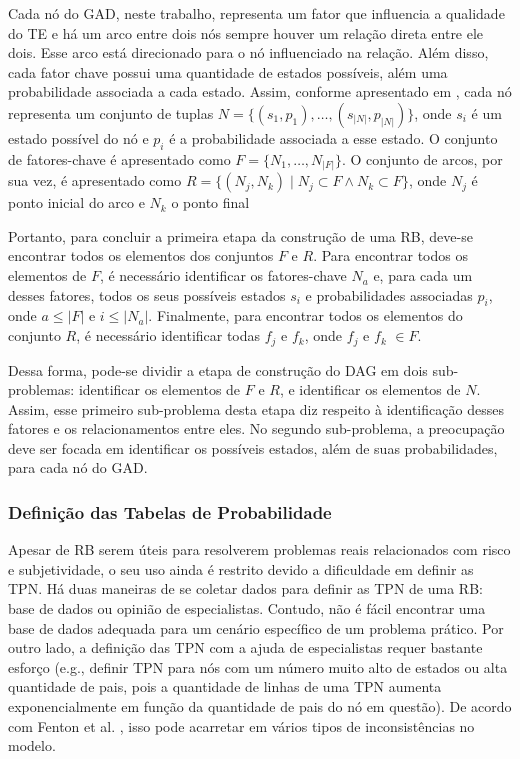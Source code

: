 Cada nó do GAD, neste trabalho, representa um fator que influencia a qualidade do TE e há um arco entre dois nós sempre houver um relação direta entre ele dois. Esse arco está direcionado para o nó influenciado na relação. Além disso, cada fator chave possui uma quantidade de estados possíveis, além uma probabilidade associada a cada estado. Assim, conforme apresentado em \cite{perkusich2013}, cada nó representa um conjunto de tuplas $N = \{(s_{1},p_{1}), \ldots, (s_{\left|{N}\right|},p_{\left|{N}\right|})\}$, onde $s_{i}$ é um estado possível do nó e $p_{i}$ é a probabilidade associada a esse estado. O conjunto de fatores-chave é apresentado como $F = \{N_{1}, \ldots, N_{\left|{F}\right|}\}$. O conjunto de arcos, por sua vez, é apresentado como $R = \{(N_{j},N_{k}) \mid N_{j} \subset F \wedge N_{k} \subset F\}$, onde $N_{j}$ é ponto inicial do arco e $N_{k}$ o ponto final

Portanto, para concluir a primeira etapa da construção de uma RB, deve-se encontrar todos os elementos dos conjuntos $F$ e $R$. Para encontrar todos os elementos de $F$, é necessário identificar os fatores-chave $N_{a}$ e, para cada um desses fatores, todos os seus possíveis estados $s_{i}$ e probabilidades associadas $p_{i}$, onde $a \le \left|{F}\right|$ e $i \le \left|{N_{a}}\right|$. Finalmente, para encontrar todos os elementos do conjunto $R$, é necessário identificar todas $f_{j}$ e $f_{k}$, onde $f_{j}$ e $f_{k}$ $\in F$.

Dessa forma, pode-se dividir a etapa de construção do DAG em dois sub-problemas: identificar os elementos de $F$ e $R$, e identificar os elementos de $N$. Assim, esse primeiro sub-problema desta etapa diz respeito à identificação desses fatores e os relacionamentos entre eles. No segundo sub-problema, a preocupação deve ser focada em identificar os possíveis estados, além de suas probabilidades, para cada nó do GAD.

\subsubsection{Definição das Tabelas de Probabilidade}
\label{fundamentacao:redes:construcao:funcoes}

Apesar de RB serem úteis para resolverem problemas reais relacionados com risco e subjetividade, o seu uso ainda é restrito devido a dificuldade em definir as TPN. Há duas maneiras de se coletar dados para definir as TPN de uma RB: base de dados ou opinião de especialistas. Contudo, não é fácil encontrar uma base de dados adequada para um cenário específico de um problema prático. Por outro lado, a definição das TPN com a ajuda de especialistas requer bastante esforço (e.g., definir TPN para nós com um número muito alto de estados ou alta quantidade de pais, pois a quantidade de linhas de uma TPN aumenta exponencialmente em função da quantidade de pais do nó em questão). De acordo com Fenton et al. \cite{fenton}, isso pode acarretar em vários tipos de inconsistências no modelo.

